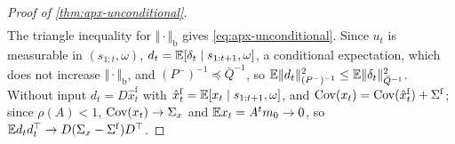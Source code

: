 \begin{proof}[Proof of \cref{thm:apx-unconditional}]
\begin{equation*}
\begin{aligned}
\end{aligned}
\end{equation*}
The triangle inequality for $\Vert\cdot\Vert_{\mathrm b}$ gives \cref{eq:apx-unconditional}. Since $u_t$ is measurable in $(s_{1:t},\omega)$, $d_t=\mathbb{E}[\delta_t\mid s_{1:t+1},\omega]$, a conditional expectation, which does not increase $\Vert\cdot\Vert_{\mathrm b}$, and $(P^-)^{-1}\preceq\bar Q^{-1}$, so $\mathbb{E}\Vert d_t\Vert^2_{(P^-)^{-1}}\le\mathbb{E}\Vert\delta_t\Vert^2_{\bar Q^{-1}}$. Without input $d_t=D\hat x^{\mathrm f}_t$ with $\hat x^{\mathrm f}_t=\mathbb{E}[x_t\mid s_{1:t+1},\omega]$, and $\operatorname{Cov}(x_t)=\operatorname{Cov}(\hat x^{\mathrm f}_t)+\Sigma^{\mathrm f}$; since $\rho(A)<1$, $\operatorname{Cov}(x_t)\to\Sigma_x$ and $\mathbb{E} x_t=A^tm_0\to0$, so $\mathbb{E} d_td_t^\top\to D(\Sigma_x-\Sigma^{\mathrm f})D^\top$.
\end{proof}

